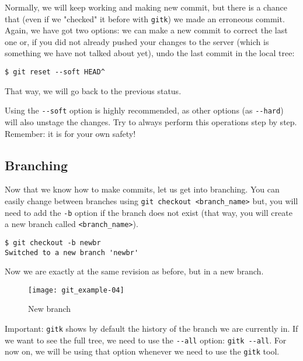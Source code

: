 \documentclass[a4paper,10pt]{article}
\newenvironment{terminal}
  {
    \vspace{+10pt}
    \begin{center}
    \begin{minipage}{0.95\textwidth}
    \begin{framed}
  }
  {
    \end{framed}
    \end{minipage}
    \end{center}
    \vspace{+10pt}
  }
\begin{document}
Normally, we will keep working and making new commit, but there is a
chance that (even if we "checked" it before with \texttt{gitk}) we
made an erroneous commit. Again, we have got two options: we can make
a new commit to correct the last one or, if you did not already pushed
your changes to the server (which is something we have not talked about
yet), undo the last commit in the local tree:

\begin{terminal}
\begin{verbatim}
$ git reset --soft HEAD^
\end{verbatim}
\end{terminal}

That way, we will go back to the previous status.

\begin{tip}
Using the \texttt{-{}-soft} option is highly recommended, as other
options (as \texttt{-{}-hard}) will also unstage the changes. Try to
always perform this operations step by step. Remember: it is for your
own safety!
\end{tip}

\subsection{Branching}

Now that we know how to make commits, let us get into branching. You can
easily change between branches using
\texttt{git checkout <branch\_name>}
but, you will need to add the \texttt{-b} option if the branch does not
exist (that way, you will create a new branch called
\texttt{<branch\_name>}).

\begin{terminal}
\begin{verbatim}
$ git checkout -b newbr
Switched to a new branch 'newbr'
\end{verbatim}
\end{terminal}

Now we are exactly at the same revision as before, but in a new branch.

\begin{figure}
  \begin{center}
    \texttt{[image: git\_example-04]}
  \end{center}
  \caption{New branch}
\end{figure}

\begin{tip}
Important: \texttt{gitk} shows by default the history of the branch we
are currently in. If we want to see the full tree, we need to use the
\texttt{-{}-all} option: \texttt{gitk -{}-all}. For now on, we will be
using that option whenever we need to use the \texttt{gitk} tool.
\end{tip}
\end{document}
